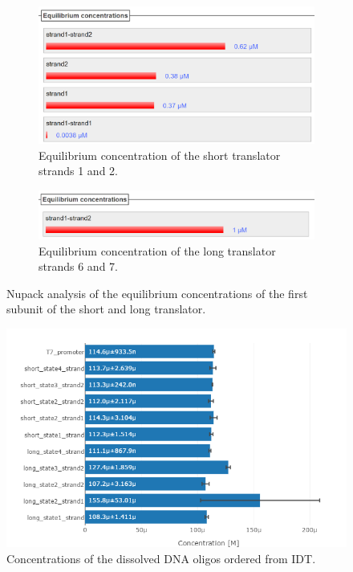 \begin{figure}[h]
\begin{subfigure}[b]{.49\columnwidth}
  \centering
  \includegraphics[width=\linewidth]{images/short_annealing_concentration.png}
  \caption{Equilibrium concentration of the short translator strands 1 and 2.}
\end{subfigure}
\hfill
\begin{subfigure}[b]{.49\columnwidth}
  \centering
  \includegraphics[width=\linewidth]{images/long_annealing_concentration.png}
  \caption{Equilibrium concentration of the long translator strands 6 and 7.}
\end{subfigure}
\caption{Nupack analysis of the equilibrium concentrations of the first subunit of the short and long translator.}
\label{annealing_concentration}
\end{figure}

\begin{figure}[h]
\centering
\includegraphics[width=\columnwidth]{images/oligo_concentrations.png}
\caption{Concentrations of the dissolved DNA oligos ordered from IDT.}
\label{oligo_concentrations}
\end{figure}

